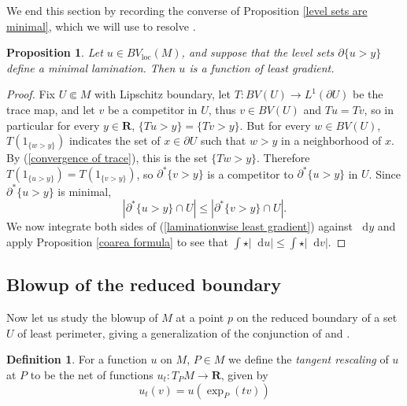\documentclass[reqno,12pt,letterpaper]{amsart}
\newcommand{\RR}{\mathbf{R}}
\newcommand*\dif{\mathop{}\!\mathrm{d}}
\newcommand{\dfn}[1]{\emph{#1}\index{#1}}
\newcommand{\loc}{\mathrm{loc}}
\newtheorem{proposition}[theorem]{Proposition}
\theoremstyle{definition}
\newtheorem{definition}[theorem]{Definition}
\numberwithin{equation}{section}
\begin{document}
We end this section by recording the converse of Proposition \ref{level sets are minimal}, which we will use to resolve \cite[Problem 9.7]{daskalopoulos2020transverse}.

\begin{proposition}\label{minimal bounding implies least gradient}
Let $u \in BV_\loc(M)$, and suppose that the level sets $\partial \{u > y\}$ define a minimal lamination.
Then $u$ is a function of least gradient.
\end{proposition}
\begin{proof}
Fix $U \Subset M$ with Lipschitz boundary, let $T: BV(U) \to L^1(\partial U)$ be the trace map, and let $v$ be a competitor in $U$, thus $v \in BV(U)$ and $Tu = Tv$, so in particular for every $y \in \RR$, $\{Tu > y\} = \{Tv > y\}$.
But for every $w \in BV(U)$, $T(1_{\{w > y\}})$ indicates the set of $x \in \partial U$ such that $w > y$ in a neighborhood of $x$.
By (\ref{convergence of trace}), this is the set $\{Tw > y\}$.
Therefore $T(1_{\{u > y\}}) = T(1_{\{v > y\}})$, so $\partial^* \{v > y\}$ is a competitor to $\partial^* \{u > y\}$ in $U$.
Since $\partial^* \{u > y\}$ is minimal,
\begin{equation}\label{laminationwise least gradient}
|\partial^* \{u > y\} \cap U| \leq |\partial^* \{v > y\} \cap U|.
\end{equation}
We now integrate both sides of (\ref{laminationwise least gradient}) against $\dif y$ and apply Proposition \ref{coarea formula} to see that $\int \star |\dif u| \leq \int \star |\dif v|$.
\end{proof}


\subsection{Blowup of the reduced boundary}
Now let us study the blowup of $M$ at a point $p$ on the reduced boundary of a set $U$ of least perimeter, giving a generalization of the conjunction of \cite[Theorem 9.3]{Giusti77} and \cite[Theorem 6.2.2]{Simons68}.

\begin{definition}
For a function $u$ on $M$, $P \in M$ we define the \dfn{tangent rescaling} of $u$ at $P$ to be the net of functions $u_t: T_PM \to \RR$, given by
$$u_t(v) = u\left(\exp_P(tv)\right)$$
\end{definition}
\end{document}
